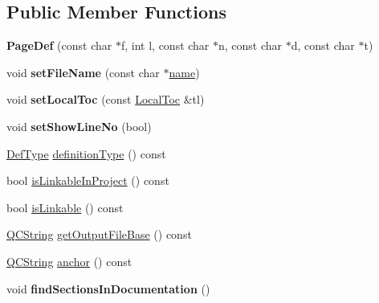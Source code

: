 \subsection*{Public Member Functions}
\begin{DoxyCompactItemize}
\item 
\mbox{\label{class_page_def_a42a37bcdc01bf39d2488eb8c7303f74c}} 
{\bfseries Page\+Def} (const char $\ast$f, int l, const char $\ast$n, const char $\ast$d, const char $\ast$t)
\item 
\mbox{\label{class_page_def_aa01c796064e41d5487f8f806d69c2db6}} 
void {\bfseries set\+File\+Name} (const char $\ast$\mbox{\hyperlink{class_definition_a9324000f785d7b6b098878a3bca4df5b}{name}})
\item 
\mbox{\label{class_page_def_af39077d1a9498622d73e6d1196140ef8}} 
void {\bfseries set\+Local\+Toc} (const \mbox{\hyperlink{class_local_toc}{Local\+Toc}} \&tl)
\item 
\mbox{\label{class_page_def_a635f175421827443109d678527c7f8b3}} 
void {\bfseries set\+Show\+Line\+No} (bool)
\item 
\mbox{\hyperlink{class_definition_intf_ada60114bc621669dd8c19edfc6421766}{Def\+Type}} \mbox{\hyperlink{class_page_def_a4485734f9ef865738e090ff6b122410f}{definition\+Type}} () const
\item 
bool \mbox{\hyperlink{class_page_def_a8aeb711470609d0be377c2b56aee9cef}{is\+Linkable\+In\+Project}} () const
\item 
bool \mbox{\hyperlink{class_page_def_acb0b424141cbb7c1b6b5a52769cf7b06}{is\+Linkable}} () const
\item 
\mbox{\hyperlink{class_q_c_string}{Q\+C\+String}} \mbox{\hyperlink{class_page_def_a7b72dba48ce4045351aed9a397ce9b0f}{get\+Output\+File\+Base}} () const
\item 
\mbox{\hyperlink{class_q_c_string}{Q\+C\+String}} \mbox{\hyperlink{class_page_def_a1de6c2c0acdb782e053af47271fb0a3d}{anchor}} () const
\item 
\mbox{\label{class_page_def_ac25a2b575428b1252acf0b71e213a7b4}} 
void {\bfseries find\+Sections\+In\+Documentation} ()
\item 
\mbox{\label{class_page_def_a11276500630ee5942ca5bab0e69e0601}} 

\end{DoxyCompactItemize}
